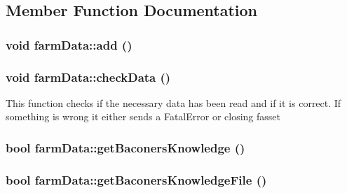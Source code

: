 \subsection{Member Function Documentation}
\hypertarget{classfarm_data_a0e7b5f2a247620c8b77b1fa0050ff3ee}{
\subsubsection[{add}]{\setlength{\rightskip}{0pt plus 5cm}void farmData::add ()}}
\label{classfarm_data_a0e7b5f2a247620c8b77b1fa0050ff3ee}
\hypertarget{classfarm_data_aa64f203450f21d7a71e80a18a3936f55}{
\subsubsection[{checkData}]{\setlength{\rightskip}{0pt plus 5cm}void farmData::checkData ()}}
\label{classfarm_data_aa64f203450f21d7a71e80a18a3936f55}
This function checks if the necessary data has been read and if it is correct. If something is wrong it either sends a FatalError or closing fasset \hypertarget{classfarm_data_abb4c880543b25ffdd508e20723362cba}{
\subsubsection[{getBaconersKnowledge}]{\setlength{\rightskip}{0pt plus 5cm}bool farmData::getBaconersKnowledge ()}}
\label{classfarm_data_abb4c880543b25ffdd508e20723362cba}
\hypertarget{classfarm_data_ad5e87ebf838260c10d07f9ffccd1bfbc}{
\subsubsection[{getBaconersKnowledgeFile}]{\setlength{\rightskip}{0pt plus 5cm}bool farmData::getBaconersKnowledgeFile ()}}
